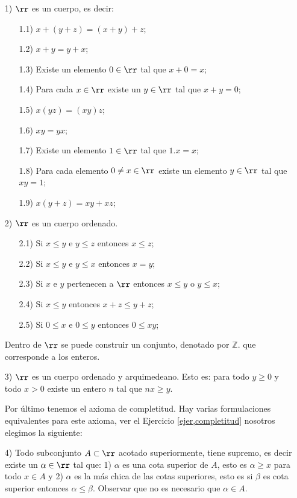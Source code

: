   \begin{itemize}
    \item[1)] $\rr$ es un cuerpo, es decir:
        \begin{itemize}
            \item[1.1)] $x+(y+z)=(x+y)+z$;
            \item[1.2)] $x+y=y+x$;
            \item[1.3)] Existe un elemento $0\in\rr$ tal que $x+0=x$;
            \item[1.4)] Para cada $x\in\rr$ existe un $y\in\rr$
            tal que $x+y=0$;
            \item[1.5)] $x(yz)=(xy)z$;
            \item[1.6)] $xy=yx$;
            \item[1.7)] Existe un elemento $1\in\rr$ tal que
            $1.x=x$;
            \item[1.8)] Para cada elemento $0\neq x\in\rr$ existe un
            elemento $y\in\rr$ tal que $xy=1$;
            \item[1.9)] $x(y+z)=xy+xz$;
        \end{itemize}
    \item[2)] $\rr$ es un cuerpo ordenado.
        \begin{itemize}
            \item[2.1)] Si $x\leq y$ e $y\leq z$ entonces $x\leq
            z$;
            \item[2.2)] Si $x\leq y$ e $y\leq x$ entonces $x=y$;
            \item[2.3)] Si $x$ e $y$ pertenecen a $\rr$ entonces
            $x\leq y$ o $y\leq x$;
            \item[2.4)] Si $x\leq y$ entonces $x+z\leq y+z$;
            \item[2.5)] Si $0\leq x$ e $0\leq y$ entonces $0\leq
            xy$;
        \end{itemize}

        Dentro de $\rr$  se puede construir un conjunto, denotado
        por $\mathbb{Z}$. que corresponde a los enteros.
    \item[3)] $\rr$ es un cuerpo ordenado y arquimedeano. Esto es:
    para todo $y\geq 0$ y todo $x>0$ existe un entero $n$ tal que
    $nx\geq y$.

    Por \'ultimo tenemos el axioma de completitud. Hay varias
    formulaciones equivalentes para este axioma, ver el Ejercicio
     \vref{ejer,completitud} nosotros elegimos
    la siguiente:

    \item[4)] Todo subconjunto $A\subset\rr$ acotado
    superiormente, tiene supremo, es decir existe un $\alpha\in\rr$
    tal que: 1) $\alpha$ es una cota superior de $A$, esto es $\alpha\geq x$
    para todo $x\in A$ y 2) $\alpha$ es la m\'as chica de las
    cotas superiores, esto es si $\beta$ es cota superior entonces
    $\alpha\leq\beta$. Observar que no es necesario que $\alpha\in
    A$.
  \end{itemize}



